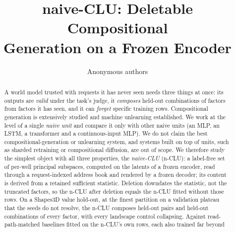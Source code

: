 \documentclass{article} %
\title{naive-CLU: Deletable Compositional\\ Generation on a Frozen Encoder}
\author{Anonymous authors}
\begin{document}
\maketitle

\begin{abstract}
A world model trusted with requests it has never seen needs three things at once: its outputs are \emph{valid} under the task's judge, it \emph{composes}
held-out combinations of factors from factors it has seen, and it can \emph{forget} specific
training rows. Compositional generation is extensively studied and machine unlearning established. We work at the level of a single \emph{naive unit} and
compare it only with other naive units (an MLP, an LSTM, a transformer and a continuous-input MLP).
We do not claim the best compositional-generation or unlearning system, and systems built on top of
units, such as sharded retraining or compositional diffusion, are out of scope.
We therefore study the simplest object with all three properties, the \emph{naive-CLU} (n-CLU): a
label-free set of per-well principal subspaces, computed on the latents of a frozen
encoder, read through a request-indexed address book and rendered by a frozen decoder; its
content is derived from a retained sufficient statistic. Deletion downdates the statistic, not the truncated factors, so the n-CLU after deletion equals the n-CLU fitted without those rows.
On a Shapes3D value hold-out, at the finest partition on a validation plateau
that the seeds do not resolve, %
the n-CLU composes held-out pairs and held-out combinations of every factor, with every landscape
control collapsing. %
Against read-path-matched baselines fitted on the n-CLU's own rows, each also trained far beyond

\end{abstract}
\end{document}
